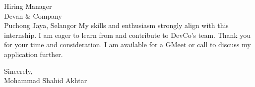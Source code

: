 \documentclass[10.5pt]{letter}
\begin{document}
\begin{letter}{Hiring Manager\\Devan \& Company\\Puchong Jaya, Selangor}
\vspace{0.5cm}
My skills and enthusiasm strongly align with this internship. I am eager to learn from and contribute to DevCo's team. Thank you for your time and consideration. I am available for a GMeet or call to discuss my application further.

\vspace{0.5cm}

\begin{flushleft}
\vspace{0.3cm}
Sincerely,\\[2ex]
Mohammad Shahid Akhtar
\end{flushleft}

\end{letter}
\end{document}

